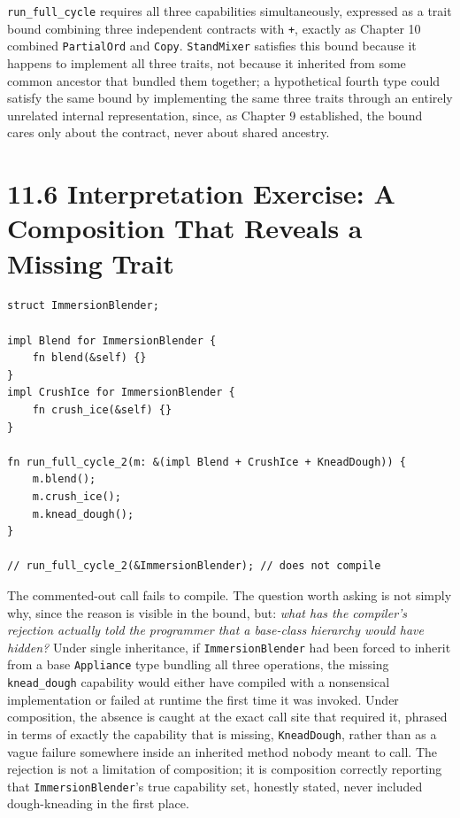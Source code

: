 \documentclass[11pt]{book}
\begin{document}
\texttt{run\_full\_cycle} requires all three capabilities simultaneously, expressed as a trait bound combining three independent contracts with \texttt{+}, exactly as Chapter 10 combined \texttt{PartialOrd} and \texttt{Copy}. \texttt{StandMixer} satisfies this bound because it happens to implement all three traits, not because it inherited from some common ancestor that bundled them together; a hypothetical fourth type could satisfy the same bound by implementing the same three traits through an entirely unrelated internal representation, since, as Chapter 9 established, the bound cares only about the contract, never about shared ancestry.

\section*{11.6 Interpretation Exercise: A Composition That Reveals a Missing Trait}

\begin{lstlisting}
struct ImmersionBlender;

impl Blend for ImmersionBlender {
    fn blend(&self) {}
}
impl CrushIce for ImmersionBlender {
    fn crush_ice(&self) {}
}

fn run_full_cycle_2(m: &(impl Blend + CrushIce + KneadDough)) {
    m.blend();
    m.crush_ice();
    m.knead_dough();
}

// run_full_cycle_2(&ImmersionBlender); // does not compile
\end{lstlisting}

The commented-out call fails to compile. The question worth asking is not simply why, since the reason is visible in the bound, but: \emph{what has the compiler's rejection actually told the programmer that a base-class hierarchy would have hidden?} Under single inheritance, if \texttt{ImmersionBlender} had been forced to inherit from a base \texttt{Appliance} type bundling all three operations, the missing \texttt{knead\_dough} capability would either have compiled with a nonsensical implementation or failed at runtime the first time it was invoked. Under composition, the absence is caught at the exact call site that required it, phrased in terms of exactly the capability that is missing, \texttt{KneadDough}, rather than as a vague failure somewhere inside an inherited method nobody meant to call. The rejection is not a limitation of composition; it is composition correctly reporting that \texttt{ImmersionBlender}'s true capability set, honestly stated, never included dough-kneading in the first place.
\end{document}
